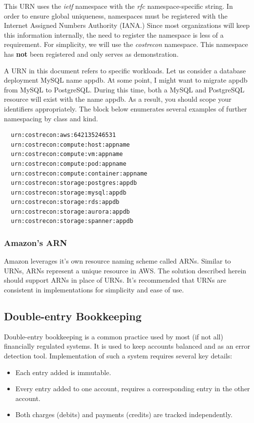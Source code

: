 \documentclass[10pt, a4paper, twocolumn]{article}
\begin{document}
    This URN uses the \textit{ietf} namespace with the \textit{rfc} namespace-specific string.
    In order to ensure global uniqueness, namespaces must be registered with the Internet Assigned Numbers Authority (IANA.)
    Since most organizations will keep this information internally, the need to register the namespace is less of a requirement.
    For simplicity, we will use the \textit{costrecon} namespace.
    This namespace has \textbf{not} been registered and only serves as demonstration.

    A URN in this document refers to specific workloads.
    Let us consider a database deployment MySQL name appdb.
    At some point, I might want to migrate appdb from MySQL to PostgreSQL.
    During this time, both a MySQL and PostgreSQL resource will exist with the name appdb.
    As a result, you should scope your identifiers appropriately.
    The block below enumerates several examples of further namespacing by class and kind.

\begin{verbatim}
  urn:costrecon:aws:642135246531
  urn:costrecon:compute:host:appname
  urn:costrecon:compute:vm:appname
  urn:costrecon:compute:pod:appname
  urn:costrecon:compute:container:appname
  urn:costrecon:storage:postgres:appdb
  urn:costrecon:storage:mysql:appdb
  urn:costrecon:storage:rds:appdb
  urn:costrecon:storage:aurora:appdb
  urn:costrecon:storage:spanner:appdb
\end{verbatim}

    \subsubsection*{Amazon's ARN}
      Amazon leverages it's own resource naming scheme called ARNs.
      Similar to URNs, ARNs represent a unique resource in AWS.
      The solution described herein should support ARNs in place of URNs.
      It's recommended that URNs are consistent in implementations for simplicity and ease of use.

  \subsection*{Double-entry Bookkeeping}
    Double-entry bookkeeping is a common practice used by most (if not all) financially regulated systems.
    It is used to keep accounts balanced and as an error detection tool.
    Implementation of such a system requires several key details:

    \begin{itemize}
      \item Each entry added is immutable.
      \item Every entry added to one account, requires a corresponding entry in the other account.
      \item Both charges (debits) and payments (credits) are tracked independently.
    \end{itemize}
\end{document}
